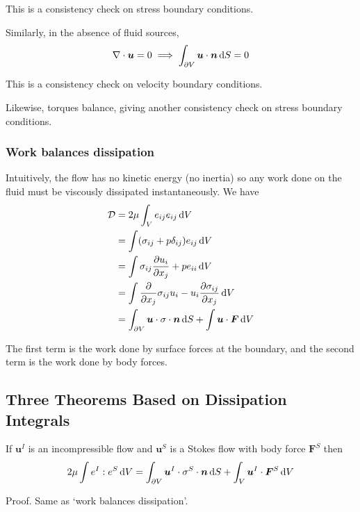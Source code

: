 \documentclass{jknotes}
\begin{document}
This is a consistency check on stress boundary conditions. 

Similarly, in the absence of fluid sources,
\begin{equation}
	\nabla \cdot \bm{u} = 0 \implies \int_{\partial V} \bm{u} \cdot \bm{n} \,
	\diffd S = 0
\end{equation}

This is a consistency check on velocity boundary conditions.

Likewise, torques balance, giving another consistency check on stress boundary
conditions.

\subsubsection{Work balances dissipation}
Intuitively, the flow has no kinetic energy (no inertia)  so any work done on
the fluid must be viscously dissipated instantaneously. We have
\begin{equation}
	\begin{aligned}
		\mathcal{D} &= 2\mu \int_V e_{ij} e_{ij} \, \diffd V \\
				&= \int (\sigma_{ij} + p \delta_{ij}) e_{ij} \, \diffd V \\
	&= \int \sigma_{ij} \frac{\partial u_i}{\partial x_j} + p e_{ii} \, \diffd V \\
	&= \int \frac{\partial}{\partial x_j} \sigma_{ij} u_i - u_i \frac{\partial
	\sigma_{ij}}{\partial x_j} \, \diffd V \\
	&= \int_{\partial V} \bm{u} \cdot \sigma \cdot \bm{n} \, \diffd S + \int
	\bm{u} \cdot \bm{F} \, \diffd V
	\end{aligned}
\end{equation}

The first term is the work done by surface forces at the boundary, and the
second term is the work done by body forces.

\subsection{Three Theorems Based on Dissipation Integrals}
\begin{lemma}
	\label{l1}
	If $\bm{u}^I$ is an incompressible flow and $\bm{u}^S$ is a Stokes flow
	with body force $\bm{F}^S$ then 
	\begin{equation}
		2\mu \int e^{I} : e^{S} \, \diffd V = \int_{\partial V} \bm{u}^I \cdot
		\sigma^S \cdot \bm{n} \, \diffd S + \int_V \bm{u}^I \cdot \bm{F}^S \,
		\diffd V
	\end{equation}
\end{lemma}
Proof. Same as `work balances dissipation'.
\end{document}
